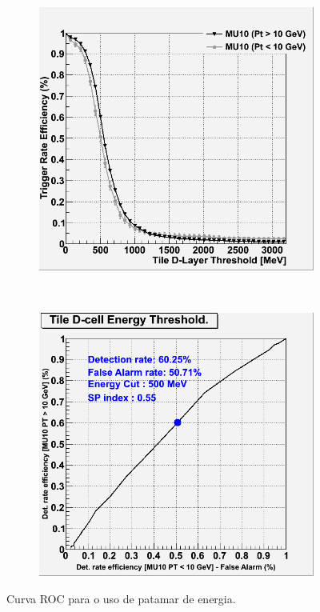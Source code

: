 \begin{figure}[H]
        \centering
        \begin{subfigure}[b]{0.45\textwidth}
                \centering
                \includegraphics[width=\textwidth]{images/sglmuon/roc_nomatch.png}
        \end{subfigure}%
        ~
        \begin{subfigure}[b]{0.45\textwidth}
                \centering
                \includegraphics[width=\textwidth]{images/sglmuon/roc_perf_nomatch.png}
        \end{subfigure}
        \caption{Curva ROC para o uso de patamar de energia.}
        \label{fig:ROCEnergy191715}
\end{figure}




